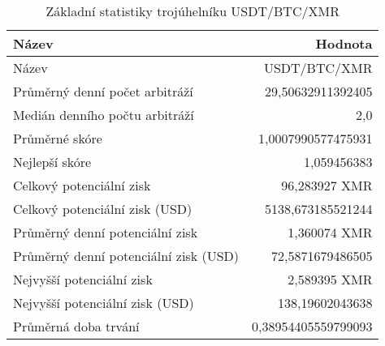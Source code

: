 \begin{table}\centering
\caption{Základní statistiky trojúhelníku USDT/BTC/XMR}
\label{USDTBTCXMR_stats}
\begin{tabular}{|| l | r ||}
\hline Název & Hodnota \\ 
\hline\hline Název & USDT/BTC/XMR \\ 
\hline Průměrný denní počet arbitráží & 29,50632911392405 \\ 
\hline Medián denního počtu arbitráží & 2,0 \\ 
\hline Průměrné skóre & 1,0007990577475931 \\ 
\hline Nejlepší skóre & 1,059456383 \\ 
\hline Celkový potenciální zisk & 96,283927 XMR \\ 
\hline Celkový potenciální zisk (USD) & 5138,673185521244 \\ 
\hline Průměrný denní potenciální zisk & 1,360074 XMR \\ 
\hline Průměrný denní potenciální zisk (USD) & 72,5871679486505 \\ 
\hline Nejvyšší potenciální zisk & 2,589395 XMR \\ 
\hline Nejvyšší potenciální zisk (USD) & 138,19602043638 \\ 
\hline Průměrná doba trvání & 0,38954405559799093 \\ 
\hline
\end{tabular}
\end{table}
